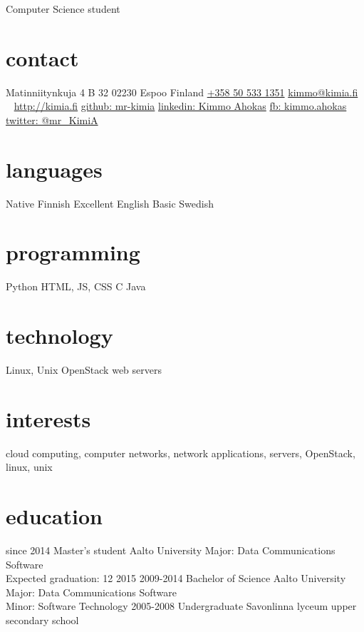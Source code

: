 \documentclass[]{friggeri-cv}
\begin{document}
       {Computer Science student}

\begin{aside}
  \section{contact}
    Matinniitynkuja 4 B 32
    02230 Espoo
    Finland
    \href{tel:+358505331351}{+358 50 533 1351}
    \href{mailto:kimmo@kimia.fi}{kimmo@kimia.fi}
    ~
    \href{http://kimia.fi}{http://kimia.fi}
    \href{https://github.com/mr-kimia}{github: mr-kimia}
    \href{https://www.linkedin.com/in/kimmoahokas}{linkedin: Kimmo Ahokas}
    \href{https://www.facebook.com/kimmo.ahokas}{fb: kimmo.ahokas}
    \href{https://twitter.com/mr_KimiA}{twitter: @mr\_KimiA}
  \section{languages}
    Native Finnish
    Excellent English
    Basic Swedish
  \section{programming}
    Python
    HTML, JS, CSS
    C
    Java
  \section{technology}
    Linux, Unix
    OpenStack
    web servers
\end{aside}

\section{interests}

cloud computing, computer networks, network applications, servers, OpenStack,
linux, unix

\section{education}

\begin{entrylist}
  \entry
    {since 2014}
    {Master's student}
    {Aalto University}
    {Major: Data Communications Software\\
    Expected graduation: 12 2015}
  \entry
    {2009-2014}
    {Bachelor of Science}
    {Aalto University}
    {Major: Data Communications Software\\
    Minor: Software Technology}
  \entry
    {2005-2008}
    {Undergraduate}
    {Savonlinna lyceum upper secondary school}
    {}
\end{entrylist}
\end{document}
